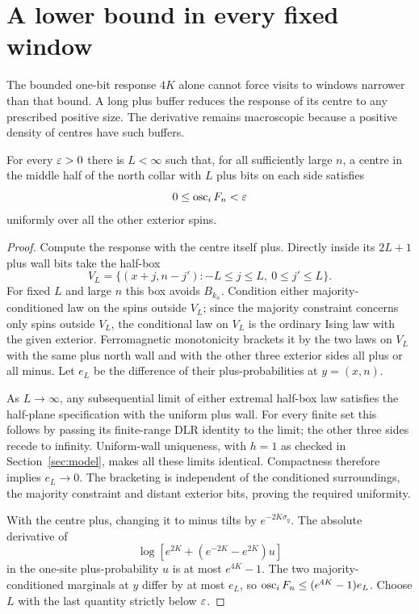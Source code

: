 \section{A lower bound in every fixed window}\label{sec:windows}
The bounded one-bit response $4K$ alone cannot force visits to windows narrower than that bound. A long plus buffer reduces the response of its centre to any prescribed positive size. The derivative remains macroscopic because a positive density of centres have such buffers.

\begin{lemma}\label{lem:buffer}
For every $\varepsilon>0$ there is $L<\infty$ such that, for all sufficiently large $n$, a centre in the middle half of the north collar with $L$ plus bits on each side satisfies
\[
 0\le\operatorname{osc}_iF_n<\varepsilon
\]
uniformly over all the other exterior spins.
\end{lemma}
\begin{proof}
Compute the response with the centre itself plus. Directly inside its $2L+1$ plus wall bits take the half-box
\[
 V_L=\{(x+j,n-j'): -L\le j\le L,\ 0\le j'\le L\}.
\]
For fixed $L$ and large $n$ this box avoids $B_{k_n}$. Condition either majority-conditioned law on the spins outside $V_L$; since the majority constraint concerns only spins outside $V_L$, the conditional law on $V_L$ is the ordinary Ising law with the given exterior. Ferromagnetic monotonicity brackets it by the two laws on $V_L$ with the same plus north wall and with the other three exterior sides all plus or all minus. Let $e_L$ be the difference of their plus-probabilities at $y=(x,n)$.

As $L\to\infty$, any subsequential limit of either extremal half-box law satisfies the half-plane specification with the uniform plus wall. For every finite set this follows by passing its finite-range DLR identity to the limit; the other three sides recede to infinity. Uniform-wall uniqueness, with $h=1$ as checked in Section~\ref{sec:model}, makes all these limits identical. Compactness therefore implies $e_L\to0$. The bracketing is independent of the conditioned surroundings, the majority constraint and distant exterior bits, proving the required uniformity.

With the centre plus, changing it to minus tilts by $e^{-2K\sigma_y}$. The absolute derivative of
\[
 \log[e^{2K}+(e^{-2K}-e^{2K})u]
\]
in the one-site plus-probability $u$ is at most $e^{4K}-1$. The two majority-conditioned marginals at $y$ differ by at most $e_L$, so $\operatorname{osc}_iF_n\le(e^{4K}-1)e_L$. Choose $L$ with the last quantity strictly below $\varepsilon$.
\end{proof}

